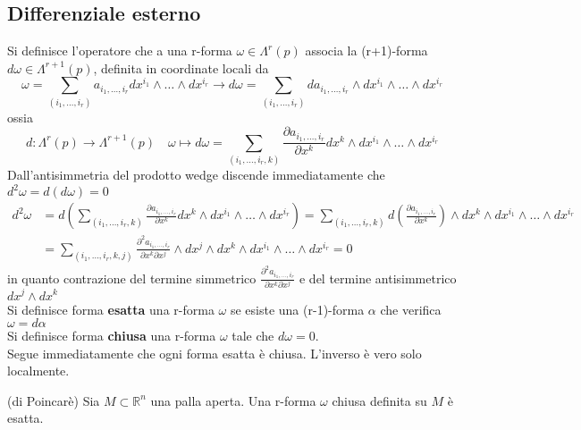 \subsection{Differenziale esterno}
Si definisce l'operatore che a una r-forma
$\omega \in \Lambda^r(p)$ associa la (r+1)-forma $d\omega \in \Lambda^{r+1}(p)$,
definita in coordinate locali da\\
$$
   \omega = \sum_{(i_1,\dots, i_r)} a_{i_1,\dots, i_r}
      dx^{i_1} \wedge \dots \wedge dx^{i_r} \to
   d\omega = \sum_{(i_1,\dots, i_r)} da_{i_1,\dots, i_r}\wedge
      dx^{i_1} \wedge \dots \wedge dx^{i_r}
$$
ossia
$$
   d : \Lambda^r(p) \to \Lambda^{r+1}(p) \quad \omega \mapsto
   d\omega = \sum_{(i_1,\dots, i_r,k)} \frac {\partial a_{i_1,\dots, i_r}}{\partial x^k} dx^k
   \wedge dx^{i_1} \wedge \dots \wedge dx^{i_r}
$$
Dall'antisimmetria del prodotto wedge discende immediatamente che $d^2\omega = d(d\omega) = 0$
\begin{equation*}
   \begin{split}
      d^2\omega & = d \left( \sum_{(i_1,\dots, i_r,k)}
            \frac {\partial a_{i_1,\dots, i_r}}{\partial x^k} dx^k
               \wedge dx^{i_1} \wedge \dots \wedge dx^{i_r} \right)
          = \sum_{(i_1,\dots, i_r,k)}
            d\left( \frac {\partial a_{i_1,\dots, i_r}}{\partial x^k} \right)
               \wedge dx^k \wedge dx^{i_1} \wedge \dots \wedge dx^{i_r} \\
       & = \sum_{(i_1,\dots, i_r,k,j)}
            \frac {\partial^2 a_{i_1,\dots, i_r}}{\partial x^k \partial x^j}
               \wedge dx^j \wedge dx^k \wedge dx^{i_1} \wedge \dots \wedge dx^{i_r}
         = 0
   \end{split}
\end{equation*}
in quanto contrazione del termine simmetrico $\frac {\partial^2 a_{i_1,\dots, i_r}}
{\partial x^k \partial x^j}$ e del termine antisimmetrico $dx^j \wedge dx^k $\\

Si definisce forma \textbf{esatta} una r-forma $\omega$ se esiste una
(r-1)-forma $\alpha$ che verifica $\omega = d\alpha$\\
Si definisce forma \textbf{chiusa} una r-forma $\omega$ tale che $d\omega = 0$.\\
Segue immediatamente che ogni forma esatta è chiusa. L'inverso è vero solo localmente.
\begin{lemma}{(di Poincarè)}
    Sia $M \subset \mathbb{R}^n$ una palla aperta. Una r-forma $\omega$ chiusa
    definita su $M$ è esatta.
\end{lemma}

